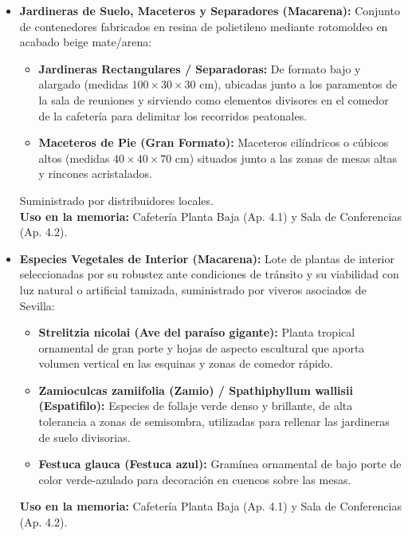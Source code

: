 \documentclass[12pt,a4paper]{article}
\begin{document}
\begin{itemize}
    \item \textbf{Jardineras de Suelo, Maceteros y Separadores (Macarena):} Conjunto de contenedores fabricados en resina de polietileno mediante rotomoldeo en acabado beige mate/arena:
    \begin{itemize}
        \item \textbf{Jardineras Rectangulares / Separadoras:} De formato bajo y alargado (medidas $100 \times 30 \times 30$ cm), ubicadas junto a los paramentos de la sala de reuniones y sirviendo como elementos divisores en el comedor de la cafetería para delimitar los recorridos peatonales.
        \item \textbf{Maceteros de Pie (Gran Formato):} Maceteros cilíndricos o cúbicos altos (medidas $40 \times 40 \times 70$ cm) situados junto a las zonas de mesas altas y rincones acristalados.
    \end{itemize}
    Suministrado por distribuidores locales. \\ \textbf{Uso en la memoria:} Cafetería Planta Baja (Ap. 4.1) y Sala de Conferencias (Ap. 4.2).
    
    \item \textbf{Especies Vegetales de Interior (Macarena):} Lote de plantas de interior seleccionadas por su robustez ante condiciones de tránsito y su viabilidad con luz natural o artificial tamizada, suministrado por viveros asociados de Sevilla:
    \begin{itemize}
        \item \textbf{Strelitzia nicolai (Ave del paraíso gigante):} Planta tropical ornamental de gran porte y hojas de aspecto escultural que aporta volumen vertical en las esquinas y zonas de comedor rápido.
        \item \textbf{Zamioculcas zamiifolia (Zamio) / Spathiphyllum wallisii (Espatifilo):} Especies de follaje verde denso y brillante, de alta tolerancia a zonas de semisombra, utilizadas para rellenar las jardineras de suelo divisorias.
        \item \textbf{Festuca glauca (Festuca azul):} Gramínea ornamental de bajo porte de color verde-azulado para decoración en cuencos sobre las mesas.
    \end{itemize}
    \textbf{Uso en la memoria:} Cafetería Planta Baja (Ap. 4.1) y Sala de Conferencias (Ap. 4.2).
\end{itemize}
\end{document}
